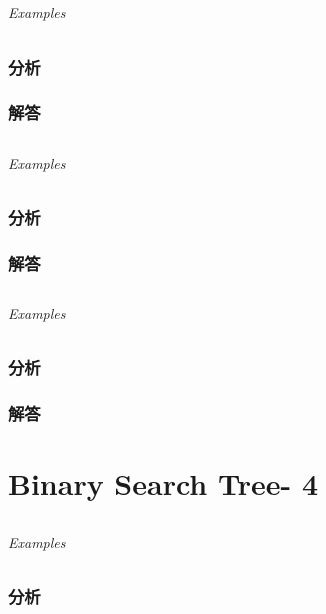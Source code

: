 \documentclass[UTF8,a4paper,12pt]{ctexbook}
\begin{document}
\section{}
	
	\subparagraph{Examples}
	
	\subsection{分析}
	
	\subsection{解答}
	
\section{}
	
	\subparagraph{Examples}
	
	\subsection{分析}
	
	\subsection{解答}
	
\section{}
	
	\subparagraph{Examples}
	
	\subsection{分析}
	
	\subsection{解答}
\chapter{Binary Search Tree- 4}
\section{}
	
	\subparagraph{Examples}
	
	\subsection{分析}
	
\end{document}
